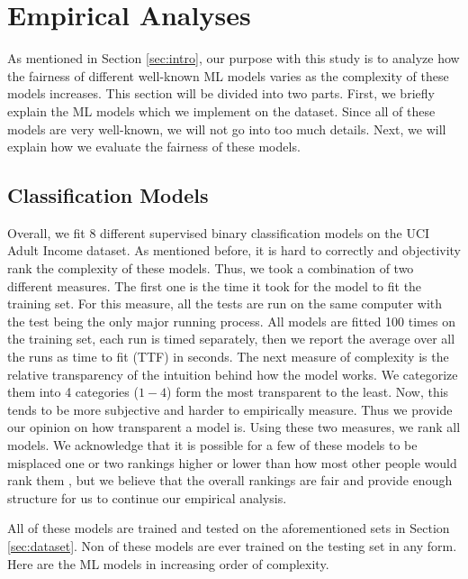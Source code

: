 \section{Empirical Analyses} \label{sec:empirical-analyses}

As mentioned in Section \ref{sec:intro}, our purpose with this study is to analyze how the fairness of different well-known ML models varies as the complexity of these models increases. This section will be divided into two parts. First, we briefly explain the ML models which we implement on the dataset. Since all of these models are very well-known, we will not go into too much details. Next, we will explain how we evaluate the fairness of these models.

\subsection{Classification Models} \label{subsec:classification-models}
Overall, we fit 8 different supervised binary classification models on the UCI Adult Income dataset. As mentioned before, it is hard to correctly and objectivity rank the complexity of these models. Thus, we took a combination of two different measures. The first one is the time it took for the model to fit the training set. For this measure, all the tests are run on the same computer with the test being the only major running process. All models are fitted 100 times on the training set, each run is timed separately, then we report the average over all the runs as time to fit (TTF) in seconds. The next measure of complexity is the relative transparency of the intuition behind how the model works. We categorize them into 4 categories ($1-4$) form the most transparent to the least. Now, this tends to be more subjective and harder to empirically measure. Thus we provide our opinion on how transparent a model is. Using these two measures, we rank all models. We acknowledge that it is possible for a few of these models to be misplaced one or two rankings higher or lower than how most other people would rank them , but we believe that the overall rankings are fair and provide enough structure for us to continue our empirical analysis. 

All of these models are trained and tested on the aforementioned sets in Section \ref{sec:dataset}. Non of these models are ever trained on the testing set in any form. Here are the ML models in increasing order of complexity.

